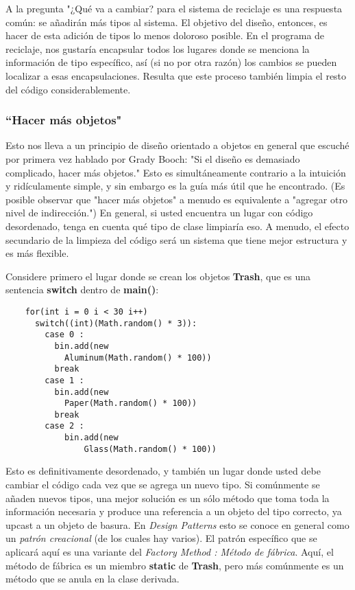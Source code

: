 
A la pregunta "¿Qué va a cambiar? para el sistema de reciclaje es una respuesta común: se añadirán más tipos al sistema. El objetivo del diseño, entonces, es hacer de esta adición de tipos lo menos doloroso posible. En el programa de reciclaje, nos gustaría encapsular todos los lugares donde se menciona la información de tipo específico, así (si no por otra razón) los cambios se pueden localizar a esas encapsulaciones. Resulta que este proceso también limpia el resto del código considerablemente.  \newline

\subsubsection*{“Hacer más objetos"}
\label{subsubsec:med}


Esto nos lleva a un principio de diseño orientado a objetos en general que escuché por primera vez hablado por Grady Booch: "Si el diseño es demasiado complicado, hacer más objetos." Esto es simultáneamente contrario a la intuición y ridículamente simple, y sin embargo es la guía más útil que he encontrado. (Es posible observar que "hacer más objetos" a menudo es equivalente a "agregar otro nivel de indirección.") En general, si usted encuentra un lugar con código desordenado, tenga en cuenta qué tipo de clase limpiaría eso. A menudo, el efecto secundario de la limpieza del código será un sistema que tiene mejor estructura y es más flexible.    \newline

Considere primero el lugar donde se crean los objetos \textbf{Trash}, que es una sentencia \textbf{switch} dentro de \textbf{main()}:    \newline

\begin{lstlisting} 
    for(int i = 0 i < 30 i++) 
      switch((int)(Math.random() * 3)): 
        case 0 : 
          bin.add(new 
            Aluminum(Math.random() * 100)) 
          break 
        case 1 : 
          bin.add(new 
            Paper(Math.random() * 100)) 
          break 
        case 2 : 
            bin.add(new 
                Glass(Math.random() * 100)) 
\end{lstlisting}

Esto es definitivamente desordenado, y también un lugar donde usted debe cambiar el código cada vez que se agrega un nuevo tipo. Si comúnmente se añaden nuevos tipos, una mejor solución es un sólo método que toma toda la información necesaria y produce una referencia a un objeto del tipo correcto, ya upcast a un objeto de basura. En \textit{Design Patterns} esto se conoce en general como un \textit{patrón creacional} (de los cuales hay varios). El patrón específico que se aplicará aquí es una variante del \textit{Factory Method : Método de fábrica}. Aquí, el método de fábrica es un miembro \textbf{static} de \textbf{Trash}, pero más comúnmente es un método que se anula en la clase derivada.  \newline

